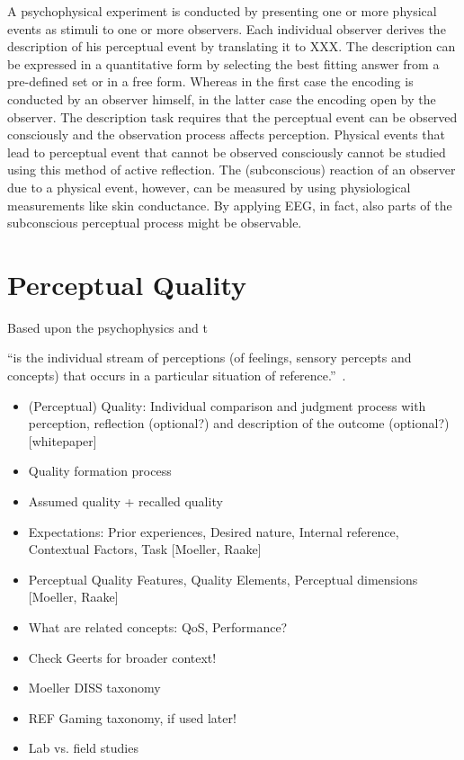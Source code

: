 A psychophysical experiment is conducted by presenting one or more physical events as stimuli to one or more observers.
Each individual observer derives the description of his perceptual event by translating it to XXX. %
The description can be expressed in a quantitative form by selecting the best fitting answer from a pre-defined set or in a free form.
Whereas in the first case the encoding is conducted by an observer himself, in the latter case the encoding open by the observer.
The description task requires that the perceptual event can be observed consciously and the observation process affects perception.
Physical events that lead to perceptual event that cannot be observed consciously cannot be studied using this method of active reflection.
The (subconscious) reaction of an observer due to a physical event, however, can be measured by using physiological measurements like skin conductance.
By applying \ac{EEG}, in fact, also parts of the subconscious perceptual process might be observable.


\section{Perceptual Quality}
Based upon the psychophysics and t

\begin{definition}[Experiencing]
``is the individual stream of perceptions (of feelings, sensory percepts and concepts) that occurs in a particular situation of reference.''~\citep[p. 13]{moller_quality_2014}.
\end{definition}


\begin{itemize}
\item (Perceptual) Quality: Individual comparison and judgment process with perception, reflection (optional?) and description of the outcome (optional?) [whitepaper]
\item Quality formation process
\item Assumed quality + recalled quality
\item Expectations: Prior experiences, Desired nature, Internal reference, Contextual Factors, Task [Moeller, Raake] 
\item Perceptual Quality Features, Quality Elements, Perceptual dimensions [Moeller, Raake]%
\item What are related concepts: QoS, Performance?
\item Check Geerts for broader context!
\item Moeller DISS taxonomy
\item REF Gaming taxonomy, if used later!
\item Lab vs. field studies
\end{itemize}


